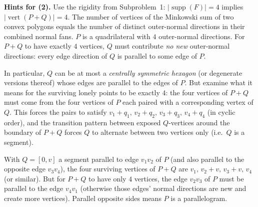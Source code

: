 \documentclass{article}
\begin{document}
\medskip
\textbf{Hints for (2).}
Use the rigidity from Subproblem~1: $|\operatorname{supp}(F)|=4$ implies
$|\operatorname{vert}(P+Q)|=4$.
The number of vertices of the Minkowski sum of two convex polygons equals the
number of distinct outer-normal directions in their combined normal fans.
$P$ is a quadrilateral with $4$ outer-normal directions.  For $P+Q$ to have
exactly $4$ vertices, $Q$ must contribute \emph{no new} outer-normal directions:
every edge direction of $Q$ is parallel to some edge of $P$.

In particular, $Q$ can be at most a \emph{centrally symmetric hexagon} (or
degenerate versions thereof) whose edges are parallel to the edges of $P$.
But examine what it means for the surviving lonely points to be exactly
$4$: the four vertices of $P+Q$ must come from the four vertices of $P$
each paired with a corresponding vertex of $Q$.  This forces the pairs to
satisfy $v_1+q_1,\, v_2+q_2,\, v_3+q_3,\, v_4+q_4$ (in cyclic order), and the
transition pattern between exposed $Q$-vertices around the boundary of
$P+Q$ forces $Q$ to alternate between two vertices only (i.e.\ $Q$ is a
segment).

With $Q=[0,v]$ a segment parallel to edge $v_1v_2$ of $P$ (and also parallel to
the opposite edge $v_3v_4$), the four surviving vertices of $P+Q$ are
$v_1,\,v_2+v,\,v_3+v,\,v_4$ (or similar).  But for $P+Q$ to have only $4$
vertices, the edge $v_2v_3$ of $P$ must be parallel to the edge $v_4v_1$
(otherwise those edges' normal directions are new and create more vertices).
Parallel opposite sides means $P$ is a parallelogram.
\end{document}
